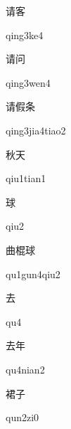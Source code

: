 \begin{verbete}[qing3ke4]{请客}
\begin{pronuncia}{qing3ke4}
\end{pronuncia}
\end{verbete}

\begin{verbete}{请问}
\begin{pronuncia}{qing3wen4}
\end{pronuncia}
\end{verbete}

\begin{verbete}{请假条}
\begin{pronuncia}{qing3jia4tiao2}
\end{pronuncia}
\end{verbete}

\begin{verbete}{秋天}
\begin{pronuncia}{qiu1tian1}
\end{pronuncia}
\end{verbete}

\begin{verbete}[qiu2]{球}
\begin{pronuncia}{qiu2}
\end{pronuncia}
\end{verbete}

\begin{verbete}{曲棍球}
\begin{pronuncia}{qu1gun4qiu2}
\end{pronuncia}
\end{verbete}

\begin{verbete}[qu4]{去}
\begin{pronuncia}{qu4}
\end{pronuncia}
\end{verbete}

\begin{verbete}[qu4nian2]{去年}
\begin{pronuncia}{qu4nian2}
\end{pronuncia}
\end{verbete}

\begin{verbete}[qun2zi0]{裙子}
\begin{pronuncia}{qun2zi0}
\end{pronuncia}
\end{verbete}

